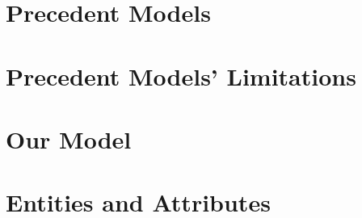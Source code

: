\documentclass[a4paper]{article}
\begin{document}
\section{Precedent Models}


\section{Precedent Models' Limitations}


\section{Our Model}


\section{Entities and Attributes}

\end{document}
